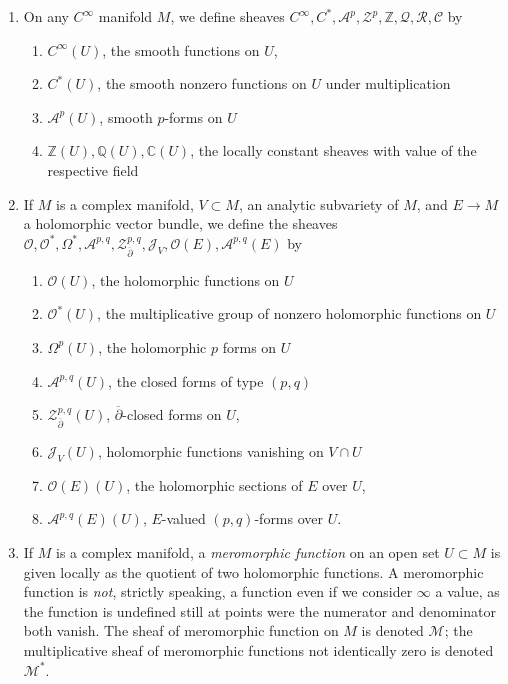 \documentclass{article}
\begin{document}
\begin{enumerate}
\item On any $ C^{\infty} $ manifold $M$, we define sheaves $ C^{\infty} , C^*, \mathcal{A}^p, \mathcal{Z}^p, \mathbb{Z}, \mathcal{Q}, \mathcal{R}, \mathcal{C}$ by

	\begin{enumerate}
	\item $ C^{\infty}( U ) $, the smooth functions on $U$,
	\item $ C^*(U)$, the smooth nonzero functions on $U$ under multiplication
	\item $ \mathcal{A}^p(U)$, smooth $p$-forms on $U$
	\item $ \mathbb{Z}(U), \mathbb{Q}(U), \mathbb{C}(U)$, the locally constant sheaves with value of the respective field
	\end{enumerate}

\item If $M$ is a complex manifold, $V \subset M$, an analytic subvariety of $M$, and $ E \to M$ a holomorphic vector bundle, we define the sheaves $ \mathcal{O}, \mathcal{O}^*, \Omega^*, \mathcal{A}^{p,q}, \mathcal{Z}^{p,q}_{ \overline{\partial} }, \mathcal{J}_V, \mathcal{O}(E), \mathcal{A}^{p,q}(E)$ by 
	\begin{enumerate}
		\item $ \mathcal{O}(U)$, the holomorphic functions on $U$
		\item $ \mathcal{O}^*(U)$, the multiplicative group of nonzero holomorphic functions on $U$
		\item $\Omega^p(U)$, the holomorphic $p$ forms on $U$
		\item $ \mathcal{A}^{p,q}(U)$, the closed forms of type $(p,q)$
		\item $ \mathcal{Z}^{p,q}_{ \overline{\partial} } (U)$, $ \overline{\partial}$-closed forms on $U$,
		\item $ \mathcal{J}_V(U)$, holomorphic functions vanishing on $V \cap U$

		\item $ \mathcal{O}(E)(U)$, the holomorphic sections of $E$ over $U$,
		\item $ \mathcal{A}^{p,q}(E)(U)$, $E$-valued $(p,q)$-forms over $U$.
	\end{enumerate}

\item If $M$ is a complex manifold, a \textit{meromorphic function} on an open set $U \subset M$ is given locally as the quotient of two holomorphic functions. A meromorphic function is \textit{not}, strictly speaking, a function even if we consider $\infty$ a value, as the function is undefined still at points were the numerator and denominator both vanish. The sheaf of meromorphic function on $M$ is denoted $ \mathcal{M}$; the multiplicative sheaf of meromorphic functions not identically zero is denoted $ \mathcal{M}^*$.
\end{enumerate}
\end{document}
